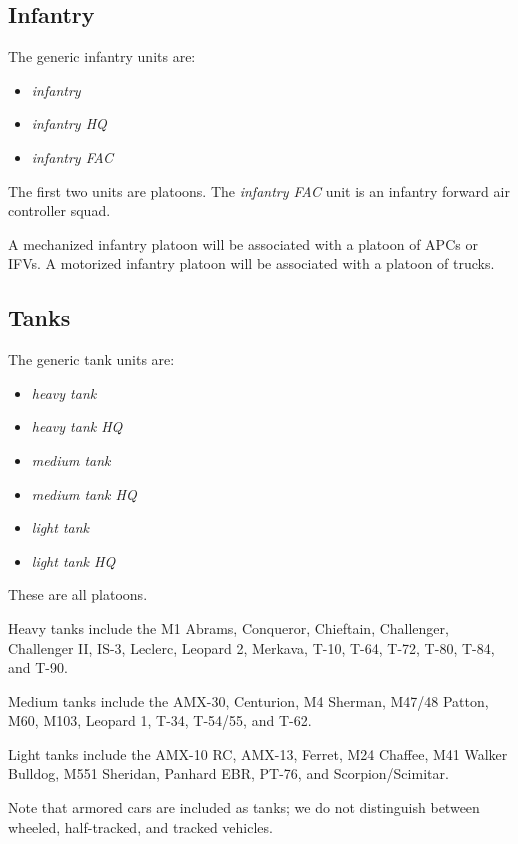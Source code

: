 \documentclass[10pt]{article}
\begin{document}

\subsection{Infantry}

The generic infantry units are:
\begin{itemize}
\item \emph{infantry}
\item \emph{infantry HQ}
\item \emph{infantry FAC}
\end{itemize}

The first two units are platoons. The \emph{infantry FAC} unit is an infantry forward air controller squad.

A mechanized infantry platoon will be associated with a platoon of APCs or IFVs. A motorized infantry platoon will be associated with a platoon of trucks.

\subsection{Tanks}

The generic tank units are:
\begin{itemize}
\item \emph{heavy tank}
\item \emph{heavy tank HQ}
\item \emph{medium tank}
\item \emph{medium tank HQ}
\item \emph{light tank}
\item \emph{light tank HQ}
\end{itemize}

These are all platoons.

Heavy tanks include the M1 Abrams, Conqueror, Chieftain, Challenger, Challenger II, IS-3, Leclerc, Leopard 2, Merkava, T-10, T-64, T-72, T-80, T-84, and T-90.

Medium tanks include the AMX-30, Centurion, M4 Sherman, M47/48 Patton, M60, M103, Leopard 1, T-34, T-54/55, and T-62. 

Light tanks include the AMX-10 RC, AMX-13, Ferret, M24 Chaffee, M41 Walker Bulldog, M551 Sheridan, Panhard EBR, PT-76, and Scorpion/Scimitar. 

Note that armored cars are included as tanks; we do not distinguish between wheeled, half-tracked, and tracked vehicles. 
\end{document}
